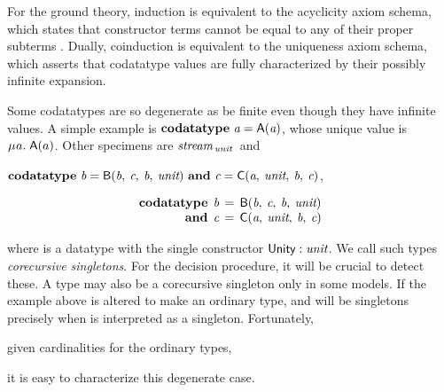For the ground theory, induction is equivalent to the acyclicity
axiom schema, which states that constructor terms cannot be equal to
any of their proper subterms \cite{barrett-et-al-2007}. Dually, coinduction
is equivalent to the uniqueness axiom schema, which asserts that codatatype
values are fully characterized by their possibly infinite expansion.




{
Some codatatypes are so degenerate as be finite even though they
have infinite values. A simple example is
\vthinspace$\textbf{codatatype}~\textit{a} = \textsf{A}(\textit{a})$, whose
unique value is $\MU a.\; \const{A}(a)$. Other specimens are
$\textit{stream}_{\,\textit{unit}\,}$
and
\begin{conf}%
\vthinspace$\textbf{codatatype}~\textit{b} = \textsf{B}(\textit{b},\: \textit{c},\: \textit{b},\: \textit{unit})
~\textbf{and}~ \textit{c} = \textsf{C}(\textit{a},\: \textit{unit},\: \textit{b},\: \textit{c})$,
\end{conf}%
\begin{rep}%
\[\begin{aligned}[t]
      \textbf{codatatype}\;\, \textit{b} & \,=\, \textsf{B}(\textit{b},\: \textit{c},\: \textit{b},\: \textit{unit}) \\[-1\jot]
      \textbf{and}\;\, \textit{c} & \,=\, \textsf{C}(\textit{a},\: \textit{unit},\: \textit{b},\: \textit{c})
\end{aligned}
\]
\end{rep}%
where  is a datatype with the single constructor $\textsf{Unity} :
\textit{unit}$. We call such types
\emph{corecursive singletons}. For the decision procedure, it will be
crucial to detect these. %
A type may also be a corecursive singleton only in some models. If the example
above is altered to make  an ordinary type,  and  will be
singletons precisely when  is interpreted as a singleton.
Fortunately, \begin{rep}given cardinalities for the ordinary types, \end{rep}%
it is easy to characterize this degenerate case.

}

